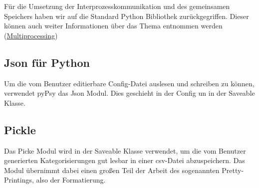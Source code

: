 \documentclass[a4paper,draft]{scrartcl}
\begin{document}
F\"ur die Umsetzung der Interprozesskommunikation und des gemeinsamen Speichers haben wir auf die Standard Python Bibliothek zur\"uckgegriffen. Dieser k\"onnen auch weiter Informationen \"uber das Thema entnommen werden (\href{''http://docs.python.org/library/multiprocessing.html''}{Multiprocessing})

\subsection{Json für Python}
Um die vom Benutzer editierbare Config-Datei auslesen und schreiben zu können, verwendet pyPsy das Json Modul. Dies geschieht in der Config un in der Saveable Klasse. 

\subsection{Pickle}
Das Picke Modul wird in der Saveable Klasse verwendet, um die vom Benutzer generierten Kategorisierungen gut lesbar in einer csv-Datei abzuspeichern. Das Modul übernimmt dabei einen großen Teil der Arbeit des sogenannten Pretty-Printings, also der Formatierung.
\end{document}
